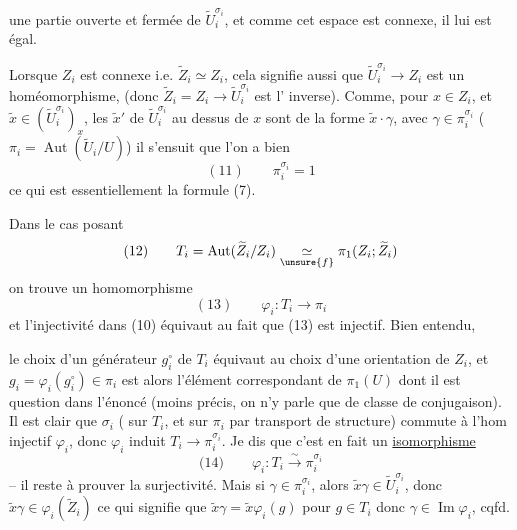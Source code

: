  une partie ouverte et fermée de
$\widetilde U_i^{\sigma_i}$, et comme cet espace est connexe,
il lui est égal.
\deleted{\[
(10)\qquad \widetilde U_i^{\sigma_i}=\operatorname{Im}(\widetilde Z_i\longrightarrow\widetilde U_i)
\]}

Lorsque $Z_i$ est  connexe i.e.
$\widetilde Z_i\simeq Z_i$, cela signifie aussi que
$\widetilde U_i^{\sigma_i}\longrightarrow Z_i$ est un homéomorphisme,
(donc $\widetilde Z_i=Z_i\longrightarrow\widetilde U_i^{\sigma_i}$ est l'
inverse). Comme, pour $x\in Z_i$,
 et $\widetilde x\in(\widetilde U_i^{\sigma_i})_x$, les
$\widetilde x'$ de $\widetilde U_i^{\sigma_i}$ au dessus de $x$ sont   de
la forme $\widetilde x\cdot\gamma$, avec $\gamma\in\pi_i^{\sigma_i}$
($\pi_i=\operatorname{Aut}(\widetilde U_i/U)$) il s'ensuit que l'on
a bien
\[
(11)\qquad \pi_i^{\sigma_i}=1
\]
ce qui est essentiellement la formule (7).

Dans le cas   posant
\[
(12)\qquad T_i=\operatorname{Aut}(\widetilde Z_i/Z_i)\underset{\unsure{f}}{\simeq}\pi_1(Z_i;\widetilde Z_i)
\]
on trouve un homomorphisme 
\[
(13)\qquad \varphi_i:T_i\longrightarrow\pi_i
\]
et l'injectivité dans (10) équivaut au fait
que (13) est injectif. Bien entendu,

le choix d'un générateur $g_i^{\circ}$ de $T_i$ équivaut au
choix d'une orientation de $Z_i$, et
$g_i=\varphi_i(g_i^{\circ})\in\pi_i$ est alors l'élément correspondant
de $\pi_1(U)$ dont il est question dans
l'énoncé (moins précis,  on n'y parle que
de classe de conjugaison). Il est clair
que $\sigma_i$ (  sur $T_i$, et sur $\pi_i$
par transport de structure) commute à
l'hom injectif $\varphi_i$, donc  $\varphi_i$
induit  $T_i\longrightarrow\pi_i^{\sigma_i}$. Je dis que
c'est en fait un \uline{isomorphisme}
\[
\text{(14)}\qquad \varphi_i:T_i\xrightarrow{\sim}\pi_i^{\sigma_i}
\]
-- il reste à prouver la surjectivité. Mais
si $\gamma\in\pi_i^{\sigma_i}$, alors $\widetilde{x}\gamma\in\widetilde{U}_i^{\sigma_i}$, donc
$\widetilde{x}\gamma\in\varphi_i(\widetilde{Z}_i)$ ce qui signifie que
$\widetilde{x}\gamma=\widetilde{x}\varphi_i(g)$  pour $g\in T_i$ donc
$\gamma\in\operatorname{Im}\varphi_i$, cqfd.

